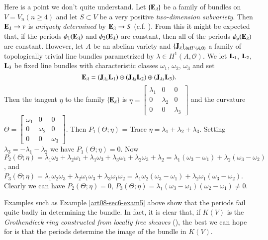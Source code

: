 \begin{example}\label{art08-sec8-exam5}
Here is a point we don't quite understand. Let $\{\mathbf{E}_{\lambda}\}$ be a family of bundles on $V=V_{n}(n\geq 4)$ and let $S\subset V$ be a very positive {\em two-dimension subvariety}. Then $\mathbf{E}_{\lambda}\to v$ is {\em uniquely determined} by $\mathbf{E}_{\lambda}\to S$ (c.f. \cite{art08-key8}). From this it might be expected that, if the periods $\phi_{1}(\mathbf{E}_{\lambda})$ and $\phi_{2}(\mathbf{E}_{\lambda})$ are constant, then all of the periods $\phi_{q}(\mathbf{E}_{\lambda})$ are constant. However, let $A$ be an abelian variety and $\{\mathbf{J}_{\lambda}\}_{\lambda\in H^{1}(A,0)}$ a family of topologically trivial line bundles parametrized by $\lambda\in H^{1}(A,\mathcal{O})$. We let $\mathbf{L}_{1}$, $\mathbf{L}_{2}$, $\mathbf{L}_{3}$ be fixed line bundles with characteristic classes $\omega_{1}$, $\omega_{2}$, $\omega_{3}$ and set
$$
\mathbf{E}_{\lambda}=(\mathbf{J}_{\lambda_{1}}\mathbf{L}_{1})\oplus (\mathbf{J}_{\lambda_{2}}\mathbf{L}_{2})\oplus (\mathbf{J}_{\lambda_{3}}\mathbf{L}_{3}).
$$
Then the tangent $\eta$ to the family $\{\mathbf{E}_{\lambda}\}$ is $\eta=\left[\begin{matrix} \lambda_{1} & 0 & 0\\ 0 & \lambda_{2} & 0\\ 0 & 0 & \lambda_{3}\end{matrix}\right]$ and the curvature $\Theta=\left[\begin{matrix} \omega_{1} & 0 & 0\\ 0 & \omega_{2} & 0\\ 0 & 0 & \omega_{3}\end{matrix}\right]$. Then $P_{1}(\Theta;\eta)$ = Trace $\eta=\lambda_{1}+\lambda_{2}+\lambda_{3}$. Setting $\lambda_{3}=-\lambda_{1}-\lambda_{2}$ we have $P_{1}(\Theta;\eta)=0$. Now $P_{2}(\Theta;\eta)=\lambda_{1}\omega_{2}+\lambda_{2}\omega_{1}+\lambda_{1}\omega_{3}+\lambda_{3}\omega_{1}+\lambda_{2}\omega_{3}+\lambda_{2}=\lambda_{1}(\omega_{3}-\omega_{1})+\lambda_{2}(\omega_{3}-\omega_{2})$, and $P_{3}(\Theta;\eta)=\lambda_{1}\omega_{2}\omega_{3}+\lambda_{2}\omega_{1}\omega_{3}+\lambda_{3}\omega_{1}\omega_{2}=\lambda_{1}\omega_{2}(\omega_{3}-\omega_{1})+\lambda_{2}\omega_{1}(\omega_{3}-\omega_{2})$. Clearly we can have $P_{2}(\Theta;\eta)=0$, $P_{3}(\Theta;\eta)=\lambda_{1}(\omega_{3}-\omega_{1})(\omega_{2}-\omega_{1})\neq 0$.
\end{example}

\begin{example}\label{art08-sec6-exam6}
Examples such as Example \ref{art08-sec6-exam5} above show that the periods fail quite badly in determining the bundle. In fact, it is clear that, if $K(V)$ is the {\em Grothendieck ring constructed from locally free sheaves} (\cite{art08-key12}), the best we can hope for is that the periods determine the image of the bundle in $K(V)$.
\end{example}

